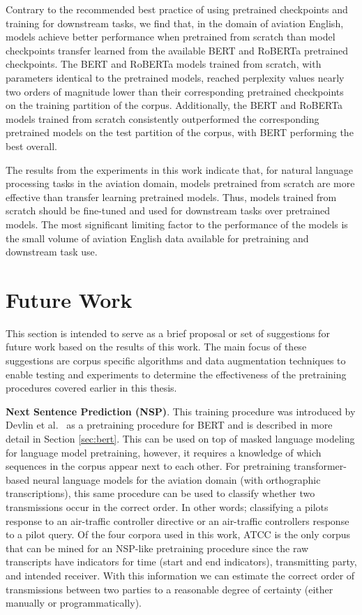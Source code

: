 \documentclass[12pt]{article}
\begin{document}
Contrary to the recommended best practice of using pretrained checkpoints and training for downstream tasks, we find that, in the domain of aviation
English, models achieve better performance when pretrained from scratch than model checkpoints transfer learned from the available BERT and RoBERTa
pretrained checkpoints. The BERT and RoBERTa models trained from scratch, with parameters identical to the pretrained models, reached perplexity
values nearly two orders of magnitude lower than their corresponding pretrained checkpoints on the training partition of the corpus. Additionally,
the BERT and RoBERTa models trained from scratch consistently outperformed the corresponding pretrained models on the test partition of the corpus,
with BERT performing the best overall.

The results from the experiments in this work indicate that, for natural language processing tasks in the aviation domain, models pretrained from
scratch are more effective than transfer learning pretrained models. Thus, models trained from scratch should be fine-tuned and used for downstream
tasks over pretrained models. The most significant limiting factor to the performance of the models is the small volume of aviation English data
available for pretraining and downstream task use.

\section{Future Work}\label{sec:future_work}
This section is intended to serve as a brief proposal or set of suggestions for future work based on the results of this work. The main focus of these
suggestions are corpus specific algorithms and data augmentation techniques to enable testing and experiments to determine the effectiveness of the
pretraining procedures covered earlier in this thesis.

\textbf{Next Sentence Prediction (NSP)}. This training procedure was introduced by Devlin et al.~\cite{devlin_bert_2019} as a pretraining procedure
for BERT and is described in more detail in Section \ref{sec:bert}. This can be used on top of masked language modeling for language model
pretraining, however, it requires a knowledge of which sequences in the corpus appear next to each other. For pretraining transformer-based neural
language models for the aviation domain (with orthographic transcriptions), this same procedure can be used to classify whether two transmissions
occur in the correct order. In other words; classifying a pilots response to an air-traffic controller directive or an air-traffic controllers
response to a pilot query. Of the four corpora used in this work, ATCC is the only corpus that can be mined for an NSP-like pretraining procedure
since the raw transcripts have indicators for time (start and end indicators), transmitting party, and intended receiver. With this information we can
estimate the correct order of transmissions between two parties to a reasonable degree of certainty (either manually or programmatically).
\end{document}
